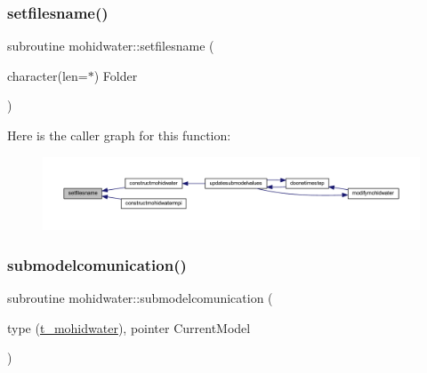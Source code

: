 \subsubsection{\texorpdfstring{setfilesname()}{setfilesname()}}
{\footnotesize\ttfamily subroutine mohidwater\+::setfilesname (\begin{DoxyParamCaption}\item[{character(len=$\ast$)}]{Folder }\end{DoxyParamCaption})}

Here is the caller graph for this function\+:\nopagebreak
\begin{figure}[H]
\begin{center}
\leavevmode
\includegraphics[width=350pt]{_main_8_f90_a9860c624aeb5adadafab3c941c17395e_icgraph}
\end{center}
\end{figure}
\mbox{\label{_main_8_f90_a7e852b1ed4379c79f70b17003d08f3c5}} 
\subsubsection{\texorpdfstring{submodelcomunication()}{submodelcomunication()}}
{\footnotesize\ttfamily subroutine mohidwater\+::submodelcomunication (\begin{DoxyParamCaption}\item[{type (\mbox{\hyperlink{structt__mohidwater}{t\+\_\+mohidwater}}), pointer}]{Current\+Model }\end{DoxyParamCaption})}

